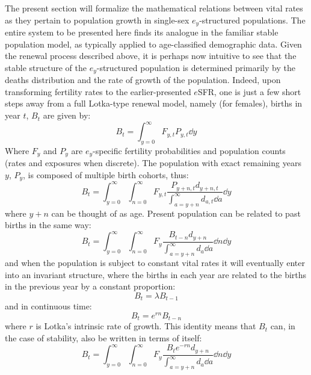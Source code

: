  \FloatBarrier
 \label{sec:ex2sexequation}
The present section will formalize the mathematical relations between vital
rates as they pertain to population growth in single-sex $e_y$-structured
populations. The entire system to be presented here finds its analogue in the
familiar stable population model, as typically applied to age-classified
demographic data. Given the renewal process described above, it is perhaps now
intuitive to see that the stable structure of the $e_y$-structured population is determined
primarily by the deaths distribution and the rate of growth of the
population. Indeed, upon transforming fertility rates to the earlier-presented
$e$SFR, one is just a few short steps away from a full Lotka-type renewal
model, namely (for females), births in year $t$, $B_{t}$ are given by:
\begin{equation}
B_t = \int_{y=0}^\infty F_{y,t} P_{y,t} \dd y
\end{equation}
Where $F_y$ and $P_y$ are $e_y$-specific fertility probabilities and population
counts (rates and exposures when discrete). The population with
exact remaining years $y$, $P_y$, is composed of multiple birth cohorts, thus:
\begin{equation}
B_t = \int_{y=0}^\infty \int_{n=0}^\infty F_{y,t}
\frac{P_{y+n,t}d_{y+n,t}}{\int_{a=y+n}^\infty d_{a,t} \dd a} \dd y
\end{equation}
where $y+n$ can be thought of as age. Present population can be related to past
births in the same way:
\begin{equation}
B_t = \int_{y=0}^\infty \int_{n=0}^\infty F_y
\frac{B_{t-n}d_{y+n}}{\int_{a=y+n}^\infty d_a \dd a} \dd n \dd y
\end{equation}
and when the population is subject to constant vital rates it will eventually
enter into an invariant structure, where the births in each year are related to
the births in the previous year by a constant proportion:
\begin{equation}
B_t = \lambda B_{t-1}
\end{equation}
and in continuous time:
\begin{equation}
B_t = e^{rn}B_{t-n}
\end{equation}
where $r$ is Lotka's intrinsic rate of growth. This identity means that $B_t$
can, in the case of stability, also be written in terms of itself:
\begin{equation}
\label{eq:exrenewal1sex}
B_t = \int_{y=0}^\infty \int_{n=0}^\infty F_y
\frac{B_{t}e^{-rn}d_{y+n}}{\int_{a=y+n}^\infty d_a \dd a} \dd n \dd y
\end{equation}
